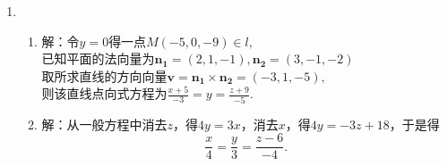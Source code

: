 \documentclass[UTF8]{ctexart}
\begin{document}
\begin{enumerate}
\item \begin{enumerate}[(1)]
\item 解：令$y=0$得一点$M\left(-5,0,-9\right)\in l,$\\
已知平面的法向量为$\mathbf{n_1}=\left(2,1,-1\right),\mathbf{n_2}=\left(3,-1,-2\right)$\\
取所求直线的方向向量$\mathbf{v}=\mathbf{n_1}\times\mathbf{n_2}=\left(-3,1,-5\right),$\\
则该直线点向式方程为$\displaystyle\frac{x+5}{-3}=y=\displaystyle\frac{z+9}{-5}.$
\item 解：从一般方程中消去$z$，得$4y=3x$，消去$x$，得$4y=-3z+18$，于是得$$\displaystyle\frac{x}{4}=\displaystyle\frac{y}{3}=\displaystyle\frac{z-6}{-4}.$$
\end{enumerate}


\end{enumerate}
\end{document}
